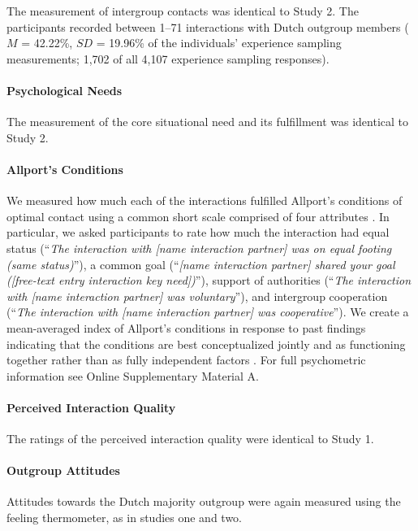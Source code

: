 The measurement of intergroup contacts was identical to Study 2. The
participants recorded between 1--71 interactions with Dutch outgroup
members (\(M\) = 42.22\%, \(SD\) = 19.96\% of the individuals'
experience sampling measurements; 1,702 of all 4,107 experience sampling
responses).

\paragraph{Psychological Needs}

The measurement of the core situational need and its fulfillment was
identical to Study 2.

\paragraph{Allport's Conditions}

We measured how much each of the interactions fulfilled Allport's
conditions of optimal contact using a common short scale comprised of
four attributes \citep{Islam1993, Voci2003, AlRamiah2012a}. In
particular, we asked participants to rate how much the interaction had
equal status
(``\textit{The interaction with [name interaction partner] was on equal footing (same status)}''),
a common goal
(``\textit{[name interaction partner] shared your goal ([free-text entry interaction key need])}''),
support of authorities
(``\textit{The interaction with [name interaction partner] was voluntary}''),
and intergroup cooperation
(``\textit{The interaction with [name interaction partner] was cooperative}'').
We create a mean-averaged index of Allport's conditions in response to
past findings indicating that the conditions are best conceptualized
jointly and as functioning together rather than as fully independent
factors \citep[][, p. 766]{Pettigrew2006}. For full psychometric
information see Online Supplementary Material A.

\paragraph{Perceived Interaction Quality}

The ratings of the perceived interaction quality were identical to Study
1.

\paragraph{Outgroup Attitudes}

Attitudes towards the Dutch majority outgroup were again measured using
the feeling thermometer, as in studies one and two.

